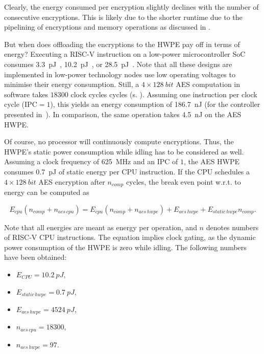 \documentclass[a4paper, 12pt]{article}
\begin{document}
Clearly, the energy consumed per encryption slightly declines with the number of consecutive encryptions. This is likely due to the shorter runtime due to the pipelining of encryptions and memory operations as discussed in .

But when does offloading the encryptions to the HWPE pay off in terms of energy? Executing a RISC-V instruction on a low-power microcontroller SoC consumes \SI{3.3}{pJ}~\cite{Schiavone2018}, \SI{10.2}{pJ}~\cite{Ickes2011}, or \SI{28.5}{pJ}~\cite{Pullini2018}. Note that all these designs are implemented in low-power technology nodes use low operating voltages to minimise their energy consumption. Still, a $4\times\SI{128}{bit}$ AES computation in software takes $18300$ clock cycles cycles (s. ). Assuming one instruction per clock cycle ($\textrm{IPC}=1$), this yields an energy consumption of \SI{186.7}{nJ} (for the controller presented in~\cite{Ickes2011}). In comparison, the same operation takes \SI{4.5}{nJ} on the AES HWPE.

Of course, no processor will continuously compute encryptions. Thus, the HWPE's static power consumption while idling has to be considered as well. Assuming a clock frequency of \SI{625}{MHz} and an IPC of $1$, the AES HWPE consumes \SI{0.7}{pJ} of static energy per CPU instruction. If the CPU schedules a $4\times\SI{128}{bit}$ AES encryption after $n_{comp}$ cycles, the break even point w.r.t. to energy can be computed as

\begin{equation*}
	E_{cpu} \left(n_{comp} + n_{aes\,cpu} \right) = E_{cpu} \left(n_{comp} + n_{aes\,hwpe} \right) + E_{aes\,hwpe} + E_{static\, hwpe} n_{comp}.
\end{equation*}

Note that all energies are meant as energy per operation, and $n$ denotes numbers of RISC-V CPU instructions. The equation implies clock gating, as the dynamic power consumption of the HWPE is zero while idling. The following numbers have been obtained:

\begin{itemize}
	\item $E_{CPU} = \SI{10.2}{pJ}$, 
	\item $E_{static\, hwpe} = \SI{0.7}{pJ}$,
	\item $E_{aes\,hwpe} = \SI{4524}{pJ}$,
	\item $n_{aes\,cpu} = 18300$,
	\item $n_{aes\,hwpe} = 97$.
\end{itemize}
\end{document}
